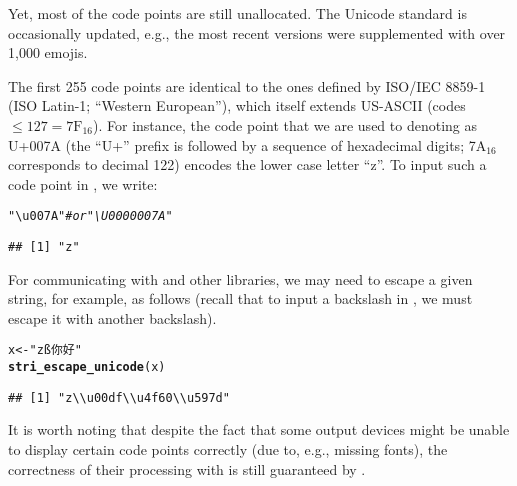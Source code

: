 \documentclass[nojss]{jss}\usepackage[]{graphicx}\usepackage[]{xcolor}
\makeatletter
\newcommand{\hlstr}[1]{\textcolor[rgb]{0.192,0.494,0.8}{#1}}%
\newcommand{\hlcom}[1]{\textcolor[rgb]{0.678,0.584,0.686}{\textit{#1}}}%
\newcommand{\hlstd}[1]{\textcolor[rgb]{0.345,0.345,0.345}{#1}}%
\newcommand{\hlkwb}[1]{\textcolor[rgb]{0.69,0.353,0.396}{#1}}%
\newcommand{\hlkwd}[1]{\textcolor[rgb]{0.737,0.353,0.396}{\textbf{#1}}}%
\newenvironment{kframe}{%
 \def\at@end@of@kframe{}%
 \ifinner\ifhmode%
  \def\at@end@of@kframe{\end{minipage}}%
  \begin{minipage}{\columnwidth}%
 \fi\fi%
 \def\FrameCommand##1{\hskip\@totalleftmargin \hskip-\fboxsep
 \colorbox{shadecolor}{##1}\hskip-\fboxsep
     \hskip-\linewidth \hskip-\@totalleftmargin \hskip\columnwidth}%
 \MakeFramed {\advance\hsize-\width
   \@totalleftmargin\z@ \linewidth\hsize
   \@setminipage}}%
 {\par\unskip\endMakeFramed%
 \at@end@of@kframe}
\newenvironment{knitrout}{}{} %
\makeatother
\begin{document}
Yet, most of the code points are still unallocated.
The Unicode standard is occasionally updated, e.g., the
most recent versions were supplemented with over 1{,}000 emojis.


The first 255 code points are identical to the ones defined
by ISO/IEC 8859-1 (ISO Latin-1;
``Western European''), which itself extends US-ASCII (codes $\le 127=\text{7F}{}_{16}$).
For instance, the code point that we are used to denoting as U+007A
(the ``U+'' prefix is followed by a sequence of hexadecimal digits;
7A${}_{16}$ corresponds to decimal 122) encodes the lower case letter ``z''.
To input such a code point in , we write:

\begin{knitrout}
\color{fgcolor}\begin{kframe}
\begin{alltt}
\hlstr{"\textbackslash{}u007A"}  \hlcom{# or "\textbackslash{}U0000007A"}
\end{alltt}
\begin{verbatim}
## [1] "z"
\end{verbatim}
\end{kframe}
\end{knitrout}


For communicating with  and other libraries,
we may need to escape a given string, for example, as follows
(recall that to input a backslash in ,
we must escape it with another backslash).

\begin{knitrout}
\color{fgcolor}\begin{kframe}
\begin{alltt}
\hlstd{x} \hlkwb{<-} \hlstr{"zß你好"}
\hlkwd{stri_escape_unicode}\hlstd{(x)}
\end{alltt}
\begin{verbatim}
## [1] "z\\u00df\\u4f60\\u597d"
\end{verbatim}
\end{kframe}
\end{knitrout}



\bigskip
It is worth noting that despite the fact that some output devices
might be unable to display certain code points correctly
(due to, e.g., missing fonts), the correctness of their
processing with  is still guaranteed by .
\end{document}
